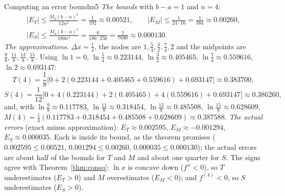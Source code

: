 \documentclass[11pt]{article}
\begin{document}
\begin{exmp}{Computing an error bound}{m5}
\emph{The bounds} with $b-a=1$ and $n=4$:
\[\begin{gathered}\lvert E_T\rvert\le\frac{M_2(b-a)^3}{12n^2}=\frac1{192}\approx0.00521,\qquad\lvert E_M\rvert\le\frac1{24\cdot16}=\frac1{384}\approx0.00260,\\\lvert E_S\rvert\le\frac{M_4(b-a)^5}{180n^4}=\frac6{180\cdot256}=\frac1{7680}\approx0.000130.\end{gathered}\]
\emph{The approximations.} $\Delta x=\frac14$, the nodes are $1,\frac54,\frac32,\frac74,2$ and the midpoints are $\frac98,\frac{11}8,\frac{13}8,\frac{15}8$. Using $\ln1=0$, $\ln\frac54\approx0.223144$, $\ln\frac32\approx0.405465$, $\ln\frac74\approx0.559616$, $\ln2\approx0.693147$:
\[T(4)=\frac18\big[0+2(0.223144+0.405465+0.559616)+0.693147\big]\approx0.383700,\]
\[S(4)=\frac1{12}\big[0+4(0.223144)+2(0.405465)+4(0.559616)+0.693147\big]\approx0.386260,\]
and, with $\ln\frac98\approx0.117783$, $\ln\frac{11}8\approx0.318454$, $\ln\frac{13}8\approx0.485508$, $\ln\frac{15}8\approx0.628609$, $M(4)=\frac14(0.117783+0.318454+0.485508+0.628609)\approx0.387588$.
\emph{The actual errors} (exact minus approximation): $E_T\approx0.002595$, $E_M\approx-0.001294$, $E_S\approx0.000035$.
Each is inside its bound, as the theorem promises ($0.002595\le0.00521$, $0.001294\le0.00260$, $0.000035\le0.000130$); the actual errors are about half of the bounds for $T$ and $M$ and about one quarter for $S$. The signs agree with Theorem~\ref{thm:consq}: $\ln x$ is concave down ($f''<0$), so $T$ underestimates ($E_T>0$) and $M$ overestimates ($E_M<0$); and $f^{(4)}<0$, so $S$ underestimates ($E_S>0$).
\end{exmp}
\end{document}
